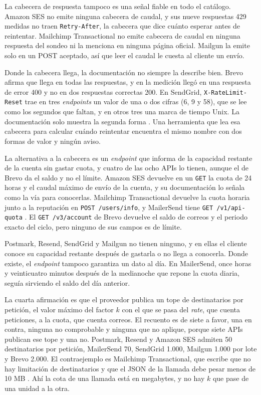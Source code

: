 La cabecera de respuesta tampoco es una señal fiable en todo el catálogo.
Amazon SES no emite ninguna cabecera de caudal, y sus nueve respuestas 429 medidas no traen \texttt{Retry-After}, la cabecera que dice cuánto esperar antes de reintentar.
Mailchimp Transactional no emite cabecera de caudal en ninguna respuesta del sondeo ni la menciona en ninguna página oficial.
Mailgun la emite solo en un POST aceptado, así que leer el caudal le cuesta al cliente un envío.

Donde la cabecera llega, la documentación no siempre la describe bien.
Brevo afirma que llega en todas las respuestas, y en la medición llegó en una respuesta de error 400 y no en dos respuestas correctas 200.
En SendGrid, \texttt{X-RateLimit-Reset} trae en tres \textit{endpoints} un valor de una o dos cifras (6, 9 y 58), que se lee como los segundos que faltan, y en otros tres una marca de tiempo Unix.
La documentación solo muestra la segunda forma \citep{sendgridratelimits}.
Una herramienta que lea esa cabecera para calcular cuándo reintentar encuentra el mismo nombre con dos formas de valor y ningún aviso.

La alternativa a la cabecera es un \textit{endpoint} que informa de la capacidad restante de la cuenta sin gastar cuota, y cuatro de las ocho APIs lo tienen, aunque el de Brevo da el saldo y no el límite.
Amazon SES devuelve en un \texttt{GET} la cuota de 24 horas y el caudal máximo de envío de la cuenta, y su documentación lo señala como la vía para conocerlas.
Mailchimp Transactional devuelve la cuota horaria junto a la reputación en \texttt{POST /users/info}, y MailerSend tiene \texttt{GET /v1/api-quota} \citep{mailersenddocs}.
El \texttt{GET /v3/account} de Brevo devuelve el saldo de correos y el periodo exacto del ciclo, pero ninguno de sus campos es de límite.

Postmark, Resend, SendGrid y Mailgun no tienen ninguno, y en ellas el cliente conoce su capacidad restante después de gastarla o no llega a conocerla.
Donde existe, el \textit{endpoint} tampoco garantiza un dato al día.
En MailerSend, once horas y veinticuatro minutos después de la medianoche que repone la cuota diaria, seguía sirviendo el saldo del día anterior.

La cuarta afirmación es que el proveedor publica un tope de destinatarios por petición, el valor máximo del factor $k$ con el que se pasa del \textit{rate}, que cuenta peticiones, a la cuota, que cuenta correos.
El recuento es de siete a favor, una en contra, ninguna no comprobable y ninguna que no aplique, porque siete APIs publican ese tope y una no.
Postmark, Resend y Amazon SES admiten 50 destinatarios por petición, MailerSend 70, SendGrid 1.000, Mailgun 1.000 por lote y Brevo 2.000.
El contraejemplo es Mailchimp Transactional, que escribe que no hay limitación de destinatarios y que el JSON de la llamada debe pesar menos de 10 MB \citep{mailchimpdocs}.
Ahí la cota de una llamada está en megabytes, y no hay $k$ que pase de una unidad a la otra.

